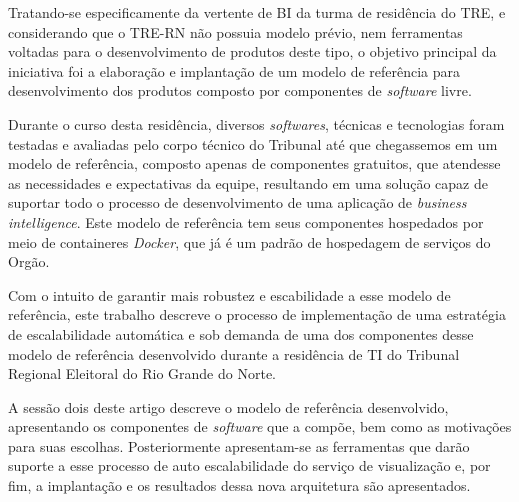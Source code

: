 Tratando-se especificamente da vertente de BI da turma de residência do TRE, e considerando que o TRE-RN não possuia modelo prévio, nem ferramentas voltadas para o desenvolvimento de produtos deste tipo, o objetivo principal da iniciativa foi a elaboração e implantação de um modelo de referência para desenvolvimento dos produtos composto por componentes de \textit{software} livre. 

Durante o curso desta residência, diversos \textit{softwares}, técnicas e tecnologias foram testadas e avaliadas pelo corpo técnico do Tribunal até que chegassemos em um modelo de referência, composto apenas de componentes gratuitos, que atendesse as necessidades e expectativas da equipe, resultando em uma solução capaz de suportar todo o processo de desenvolvimento de uma aplicação de \textit{business intelligence}. Este modelo de referência tem seus componentes hospedados por meio de containeres \textit{Docker}, que já é um padrão de hospedagem de serviços do Orgão.

Com o intuito de garantir mais robustez e escabilidade a esse modelo de referência, este trabalho descreve o processo de implementação de uma estratégia de escalabilidade automática e sob demanda de uma dos componentes desse modelo de referência desenvolvido durante a residência de TI do Tribunal Regional Eleitoral do Rio Grande do Norte.  

A sessão dois deste artigo descreve o modelo de referência desenvolvido, apresentando os componentes de \textit{software} que a compõe, bem como as motivações para suas escolhas. Posteriormente apresentam-se as ferramentas que darão suporte a esse processo de auto escalabilidade do serviço de visualização e, por fim, a implantação e os resultados dessa nova arquitetura são apresentados.